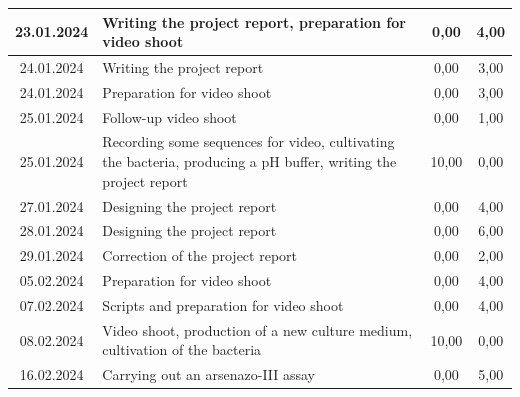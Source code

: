 \begin{longtable}{|c|p{7cm}|c|c|}
    23.01.2024    & Writing the project report, preparation for video shoot                                                         & 0,00                 & 4,00              \\ \hline
    24.01.2024    & Writing the project report                                                                                      & 0,00                 & 3,00              \\ \hline
    24.01.2024    & Preparation for video shoot                                                                                     & 0,00                 & 3,00              \\ \hline
    25.01.2024    & Follow-up video shoot                                                                                           & 0,00                 & 1,00              \\ \hline
    25.01.2024    & Recording some sequences for video, cultivating the bacteria, producing a pH buffer, writing the project report & 10,00 & 0,00 \\ \hline
    27.01.2024    & Designing the project report                                                                                    & 0,00                 & 4,00              \\ \hline
    28.01.2024    & Designing the project report                                                                                    & 0,00                 & 6,00              \\ \hline
    29.01.2024    & Correction of the project report                                                                                & 0,00                 & 2,00              \\ \hline
    05.02.2024    & Preparation for video shoot                                                                                     & 0,00                 & 4,00              \\ \hline
    07.02.2024    & Scripts and preparation for video shoot                                                                         & 0,00                 & 4,00              \\ \hline
    08.02.2024    & Video shoot, production of a new culture medium, cultivation of the bacteria & 10,00 & 0,00 \\ \hline
    16.02.2024    & Carrying out an arsenazo-III assay                                                                              & 0,00                 & 5,00              \\ \hline

\end{longtable}
